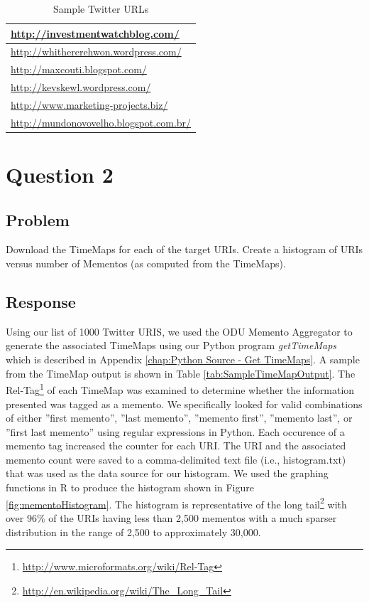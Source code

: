 \documentclass[letterpaper,11pt]{report}
\begin{document}
\begin{savenotes}
\begin{table}[htbp]
	\centering
    \begin{tabular}{l}
		\hline
    \url{http://investmentwatchblog.com/ }       \\ \hline
    \url{http://whithererehwon.wordpress.com/}   \\ \hline
    \url{http://maxcouti.blogspot.com/}          \\ \hline
    \url{http://kevskewl.wordpress.com/}         \\ \hline
    \url{http://www.marketing-projects.biz/}     \\ \hline
    \url{http://mundonovovelho.blogspot.com.br/} \\ \hline
    \end{tabular}
		\caption{Sample Twitter URLs}
		\label{tab:SampleTwitterURLs}
\end{table}


\section{Question 2}
\subsection{Problem}Download the TimeMaps for each of the target URIs. Create a histogram of URIs versus number of Mementos (as computed from the TimeMaps).
\subsection{Response}Using our list of 1000 Twitter URIS, we used the ODU Memento Aggregator to generate the associated TimeMaps using our Python program \emph{getTimeMaps} which is described in Appendix \ref{chap:Python Source - Get TimeMaps}. A sample from the TimeMap output is shown in Table \ref{tab:SampleTimeMapOutput}. The Rel-Tag\footnote{\url{http://www.microformats.org/wiki/Rel-Tag}} of each TimeMap was examined to determine whether the information presented was tagged as a memento.  We specifically looked for valid combinations of either ''first memento'', ''last memento'', ''memento first'', ''memento last'', or ''first last memento'' using regular expressions in Python. Each occurence of a memento tag increased the counter for each URI. The URI and the associated memento count were saved to a comma-delimited text file (i.e., histogram.txt) that was used as the data source for our histogram. We used the graphing functions in R to produce the histogram shown in Figure \ref{fig:mementoHistogram}. The histogram is representative of the long tail\footnote{\url{http://en.wikipedia.org/wiki/The_Long_Tail}} with over 96\% of the URIs having less than 2,500 mementos with a much sparser distribution in the range of 2,500 to approximately 30,000.


\end{savenotes}
\end{document}
